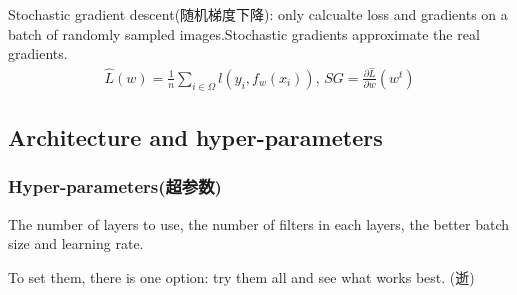 Stochastic gradient descent(随机梯度下降): only calcualte loss and gradients on a batch of randomly sampled images.Stochastic gradients approximate the real gradients.
\begin{align*}
    \hat{L}(w)=\frac{1}{n}\sum_{i\in \Omega}l(y_i,f_w(x_i)),\, SG=\frac{\partial \hat{L}}{\partial w}(w^t)
\end{align*}

\subsection{Architecture and hyper-parameters}

\subsubsection{Hyper-parameters(超参数)}
The number of layers to use, the number of filters in each layers, the better batch size and learning rate. 

To set them, there is one option: try them all and see what works best. (逝)

